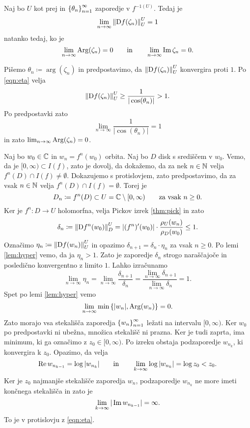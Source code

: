 \begin{lema}
    Naj bo \(U\) kot prej in \(\left\{ \theta_n \right\}_{n = 1}^{\infty}\) zaporedje v \(f^{-1 (U)}\). Tedaj je 
    \[\lim_{n \to \infty} \left\| \mathrm{D} f (\zeta_n) \right\|_{U}^{U} = 1\]
    natanko tedaj, ko je
    \[\lim_{n \to \infty} \operatorname{Arg} (\zeta_n) = 0 \qquad \text{in} \qquad \lim_{n \to \infty} \operatorname{Im} \zeta_n = 0.\]
\end{lema}

\begin{dokaz}    
    Pišemo \(\theta_n \coloneq \arg (\zeta_n)\) in predpostavimo, da \(\left\| \mathrm{D} f (\zeta_n) \right\|_{U}^{U}\) konvergira proti \(\num{1}\). Po \eqref{eqn:eta} velja
    \[\left\| \mathrm{D} f (\zeta_n) \right\|_{U}^{U} \geq \frac{1}{|\cos (\theta_n)|} > 1.\]
    Po predpostavki zato \[\lim_{n \to \infty} \frac{1}{|\cos (\theta_n)|} = 1\] in zato \(\lim_{n \to \infty} \operatorname{Arg} (\zeta_n) = 0\).
\end{dokaz}

\begin{dokaz}
    Naj bo \(w_0 \in \mathbb C\) in \(w_n = f^n (w_0)\) orbita. Naj bo \(D\) disk s središčem v \(w_0\). Vemo, da je \([0, \infty) \subset I (f)\), zato je dovolj, da dokažemo, da za nek \(n \in \mathbb N\) velja \(f^n (D) \cap I (f) \neq \emptyset\). Dokazujemo s protislovjem, zato predpostavimo, da za vsak \(n \in \mathbb N\) velja \(f^n (D) \cap I (f) = \emptyset\). Torej je
    \[D_n \coloneq f^n (D) \subset U = \mathbb C \setminus [0, \infty) \qquad \text{za vsak } n \geq 0.\]
    Ker je \(f^n \colon D \to U\) holomorfna, velja Pickov izrek \ref{thm:pick} in zato
    \[\delta_n \coloneq \left\| \mathrm{D} f^n (w_0) \right\|_{D}^{U} = |(f^n)' (w_0)| \cdot \frac{\rho_U (w_n)}{\rho_D (w_0)} \leq 1.\]
    Označimo \(\eta_n \coloneq \left\| \mathrm{D} f (w_n) \right\|_{U}^{U}\) in opazimo \(\delta_{n + 1} = \delta_n \cdot \eta_n\) za vsak \(n \geq 0\). Po lemi \ref{lem:hyper} vemo, da ja \(\eta_n > 1\). Zato je zaporedje \(\delta_n\) strogo naraščajoče in posledično konvergentno z limito \(\num{1}\). Lahko izračunamo
    \[\lim_{n \to \infty} \eta_n = \lim_{n \to \infty} \frac{\delta_{n + 1}}{\delta_n} = \frac{\lim_{n \to \infty} \delta_{n + 1}}{\lim_{n \to \infty} \delta_n} = 1.\]
    Spet po lemi \ref{lem:hyper} vemo
    \[\lim_{n \to \infty} \min \left\{ |w_n|, \operatorname{Arg} (w_n) \right\} = 0.\]
    Zato morajo vsa stekališča zaporedja \(\left\{ w_n \right\}_{n = 1}^{\infty}\) ležati na intervalu \([0, \infty)\). Ker \(w_0\) po predpostavki ni ubežna, množica stekališč ni prazna. Ker je tudi zaprta, ima minimum, ki ga označimo z \(z_0 \in [0, \infty)\). Po izreku obstaja podzaporedje \(w_{n_{k}}\), ki konvergira k \(z_0\). Opazimo, da velja
    \[\operatorname{Re} w_{n_{k - 1}} = \log |w_{n_{k}}| \qquad \text{in} \qquad \lim_{k \to \infty} \log |w_{n_{k}}| = \log z_0 < z_0.\]
    Ker je \(z_0\) najmanjše stekališče zaporedja \(w_n\), podzaporedje \(w_{n_{k}}\) ne more imeti končnega stekališča in zato je
    \[\lim_{k \to \infty} |\operatorname{Im} w_{n_{k-1}}| = \infty.\]
    To je v protislovju z \eqref{eqn:eta}.
\end{dokaz}

